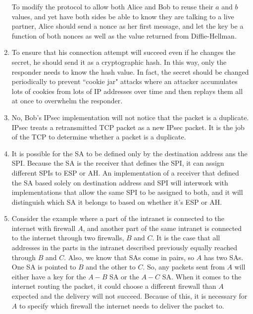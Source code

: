 \documentclass[11pt]{article}
\begin{document}
\begin{enumerate}
To modify the protocol to allow both Alice and Bob to reuse their $a$ and $b$ values, and yet have both sides be able to know they are talking to a live partner, Alice should send a nonce as her first message, and let the key be a function of both nonces as well as the value returned from Diffie-Hellman.  

\item 

To ensure that his connection attempt will succeed even if he changes the secret, he should send it as a cryptographic hash.  In this way, only the responder needs to know the hash value.  In fact, the secret should be changed periodically to prevent ``cookie jar" attacks where an attacker accumulates lots of cookies from lots of IP addresses over time and then replays them all at once to overwhelm the responder.  

\item 

No, Bob's IPsec implementation will not notice that the packet is a duplicate.  IPsec treats a retransmitted TCP packet as a new IPsec packet.  It is the job of the TCP to determine whether a packet is a duplicate.  

\item 

It is possible for the SA to be defined only by the destination address ans the SPI.  Because the SA is the receiver that defines the SPI, it can assign different SPIs to ESP or AH.  An implementation of a receiver that defined the SA based solely on destination address and SPI will interwork with implementations that allow the same SPI to be assigned to both, and it will distinguish which SA it belongs to based on whether it's ESP or AH.  

\item 

Consider the example where a part of the intranet is connected to the internet with firewall $A$, and another part of the same intranet is connected to the internet through two firewalls, $B$ and $C$.  It is the case that all addresses in the parts in the intranet  described previously equally reached through $B$ and $C$.  Also, we know that SAs come in pairs, so $A$ has two SAs.  One SA is pointed to $B$ and the other to $C$.  So, any packets sent from $A$ will either have a key for the $A-B$ SA or the $A-C$ SA.  When it comes to the internet routing the packet, it could choose a different firewall than $A$ expected and the delivery will not succeed.  Because of this, it is necessary for $A$ to specify which firewall the internet needs to deliver the packet to.  


\end{enumerate}
\end{document}
